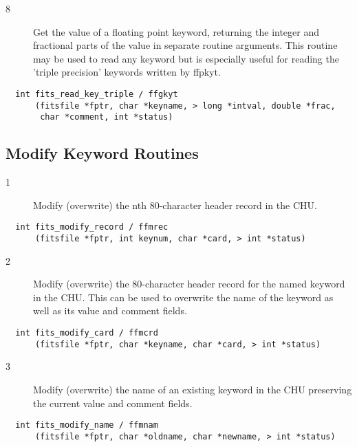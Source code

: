 \begin{description}
\item[8 ] Get the value of a floating point keyword, returning the integer and
    fractional parts of the value in separate routine arguments.
    This routine may be used to read any keyword but is especially
   useful for reading the 'triple precision' keywords written by ffpkyt.
\end{description}

\begin{verbatim}
  int fits_read_key_triple / ffgkyt
      (fitsfile *fptr, char *keyname, > long *intval, double *frac,
       char *comment, int *status)
\end{verbatim}


\subsection{ Modify Keyword Routines \label{FFMREC}}


\begin{description}
\item[1 ] Modify (overwrite) the nth 80-character header record in the CHU.
\end{description}

\begin{verbatim}
  int fits_modify_record / ffmrec
      (fitsfile *fptr, int keynum, char *card, > int *status)
\end{verbatim}

\begin{description}
\item[2 ] Modify (overwrite) the 80-character header record for the named keyword
    in the CHU.  This can be used to overwrite the name of the keyword as
   well as its value and comment fields.
\end{description}

\begin{verbatim}
  int fits_modify_card / ffmcrd
      (fitsfile *fptr, char *keyname, char *card, > int *status)
\end{verbatim}

\begin{description}
\item[3 ] Modify (overwrite) the name of an existing keyword in the CHU
   preserving the current value and comment fields.
\end{description}

\begin{verbatim}
  int fits_modify_name / ffmnam
      (fitsfile *fptr, char *oldname, char *newname, > int *status)
\end{verbatim}


